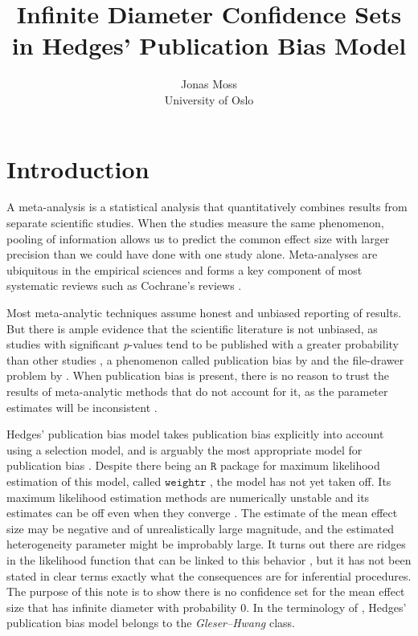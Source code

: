 \documentclass[article]{ajs}
\author{Jonas Moss \\ University of Oslo}
\title{Infinite Diameter Confidence Sets in Hedges' Publication Bias Model}
\numberwithin{equation}{section}
\numberwithin{figure}{section}
\theoremstyle{plain}
\theoremstyle{definition}
\theoremstyle{definition}
\theoremstyle{plain}
\begin{document}
\section{Introduction}

A meta-analysis is a statistical analysis that quantitatively combines
results from separate scientific studies. When the studies measure
the same phenomenon, pooling of information allows us to predict the
common effect size with larger precision than we could have done with
one study alone. Meta-analyses are ubiquitous in the empirical sciences
and forms a key component of most systematic reviews such as Cochrane's
reviews \citep{Higgins2019-vv}.

Most meta-analytic techniques assume honest and unbiased reporting
of results. But there is ample evidence that the scientific literature
is not unbiased, as studies with\emph{ }significant \emph{p}-values
tend to be published with a greater probability than other studies
\citep{Easterbrook1991-ph}, a phenomenon called publication bias
by \citet{sterling1959publication} and the file-drawer problem by
\citet{Rosenthal1979-pm}. When publication bias is present, there
is no reason to trust the results of meta-analytic methods that do
not account for it, as the parameter estimates will be inconsistent
\citep{Carter2019-rw}. 

Hedges' \citeyearpar{hedges1992modeling} publication bias model takes
publication bias explicitly into account using a selection model,
and is arguably the most appropriate model for publication bias \citep{Carter2019-rw}.
Despite there being an $\mathtt{R}$ \citep{Team2013-tt} package
for maximum likelihood estimation of this model, called $\texttt{weightr}$
\citep{Coburn2019-ec}, the model has not yet taken off. Its maximum
likelihood estimation methods are numerically unstable and its estimates
can be off even when they converge \citep{Coburn2019-ec,Stanley2005-ng}.
The estimate of the mean effect size may be negative and of unrealistically
large magnitude, and the estimated heterogeneity parameter might be
improbably large. It turns out there are ridges in the likelihood
function that can be linked to this behavior \citep{McShane2016-rb},
but it has not been stated in clear terms exactly what the consequences
are for inferential procedures. The purpose of this note is to show
there is no confidence set for the mean effect size that has infinite
diameter with probability $0$. In the terminology of \citet{berger1999integrated},
Hedges' publication bias model belongs to the \emph{Gleser--Hwang}
class.
\end{document}
